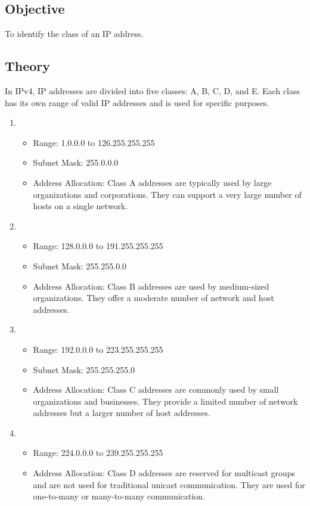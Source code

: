 \documentclass{korigamik}
\begin{document}
\subsection*{Objective}
To identify the class of an IP address.
\subsection*{Theory}
In IPv4, IP addresses are divided into five classes: A, B, C, D, and E. Each
class has its own range of valid IP addresses and is used for specific
purposes.

\begin{enumerate}[label=\textbf{Class \Alph*:}, leftmargin=2cm]
	\item \begin{itemize}
		      \item Range: 1.0.0.0 to 126.255.255.255
		      \item Subnet Mask: 255.0.0.0
		      \item Address Allocation: Class A addresses are typically used by large organizations and corporations. They can support a very large number of hosts on a single network.
	      \end{itemize}
	      
	\item \begin{itemize}
		      \item Range: 128.0.0.0 to 191.255.255.255
		      \item Subnet Mask: 255.255.0.0
		      \item Address Allocation: Class B addresses are used by medium-sized organizations. They offer a moderate number of network and host addresses.
	      \end{itemize}
	      
	\item \begin{itemize}
		      \item Range: 192.0.0.0 to 223.255.255.255
		      \item Subnet Mask: 255.255.255.0
		      \item Address Allocation: Class C addresses are commonly used by small organizations and businesses. They provide a limited number of network addresses but a larger number of host addresses.
	      \end{itemize}
	      
	\item \begin{itemize}
		      \item Range: 224.0.0.0 to 239.255.255.255
		      \item Address Allocation: Class D addresses are reserved for multicast groups and are not used for traditional unicast communication. They are used for one-to-many or many-to-many communication.
	      \end{itemize}
	      

\end{enumerate}
\end{document}
